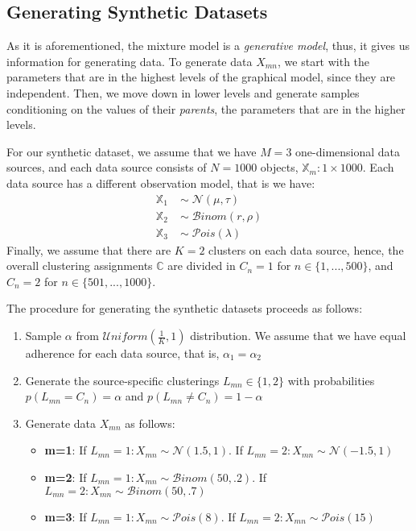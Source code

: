 \subsection{Generating Synthetic Datasets} \label{integr-synth-data-sect}
As it is aforementioned, the mixture model is a \emph{generative model}, thus, it gives us information for generating data. To generate data $X_{mn}$, we start with the parameters that are in the highest levels of the graphical model, since they are independent. Then, we move down in lower levels and generate samples conditioning on the values of their \emph{parents}, \ie the parameters that are in the higher levels. 

For our synthetic dataset, we assume that we have $M=3$ one-dimensional data sources, and each data source consists of $N=1000$ objects, \ie $\mathbb{X}_{m} : 1 \times 1000$. Each data source has a different observation model, that is we have:
\begin{equation*}
  \begin{aligned}
  	\mathbb{X}_{1} \; & \sim \; \mathcal{N}(\mu, \tau) \\
  	\mathbb{X}_{2} \; & \sim \; \mathcal{B}inom(r, \rho) \\
  	\mathbb{X}_{3} \; & \sim \; \mathcal{P}ois(\lambda)
  \end{aligned}
\end{equation*}
Finally, we assume that there are $K=2$ clusters on each data source, hence, the overall clustering assignments $\mathbb{C}$ are divided in $C_{n}=1$ for $n \in \lbrace 1,...,500 \rbrace$, and $C_{n}=2$ for $n \in \lbrace 501,...,1000 \rbrace$. 

The procedure for generating the synthetic datasets proceeds as follows:
\begin{enumerate}
	\item{
		Sample $\alpha$ from $\mathcal{U}niform(\frac{1}{K}, 1)$ distribution. We assume that we have equal adherence for each data source, that is, $\alpha_{1} = \alpha_{2}$
	}
	\item{
		Generate the source-specific clusterings $L_{mn} \in \lbrace 1,2 \rbrace$ with probabilities $p(L_{mn} = C_{n}) = \alpha$ and $p(L_{mn} \neq C_{n}) = 1 - \alpha$
	}
	\item{
		Generate data $X_{mn}$ as follows:
		\begin{itemize}
			\item{
				\textbf{m=1}: If $L_{mn}=1 : X_{mn} \sim \mathcal{N}(1.5, 1)$. If $L_{mn}=2 : X_{mn} \sim \mathcal{N}(-1.5, 1)$
			}
			\item{ 
				\textbf{m=2}: If $L_{mn}=1 : X_{mn} \sim \mathcal{B}inom(50, .2)$. If $L_{mn}=2 : X_{mn} \sim \mathcal{B}inom(50, .7)$
			}
			\item{ 
				\textbf{m=3}: If $L_{mn}=1 : X_{mn} \sim \mathcal{P}ois(8)$. If $L_{mn}=2 : X_{mn} \sim \mathcal{P}ois(15)$
			}
		\end{itemize}	
	}
\end{enumerate}

